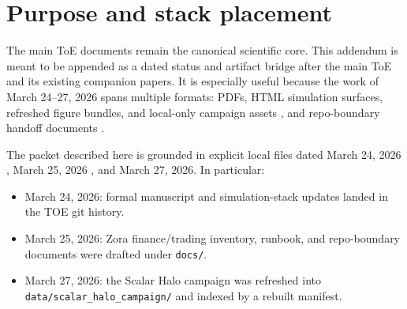 
\maketitle
\thispagestyle{empty}

\begin{abstract}
\ifIncludeRepoBoundary
This addendum records the publication-facing and repository-facing work completed between March 24, 2026 and March 27, 2026 so it can be appended cleanly to the existing Theory of Everything packet. The update covers four lanes: the MQGT--SCF Phase II and H1 supporting papers, the canonical ZoraASI top-10 simulation stack, the refreshed Scalar Halo / Cosmic Piano campaign package now housed under the TOE repository, and the March 25, 2026 cross-repository operating-boundary documents for the Zora finance and trading workstreams. The goal is not to restate the full ToE, but to provide a dated bridge from the main ToE volumes to the work actually shipped in this interval.
\else
This addendum records the publication-facing and campaign work completed between March 24, 2026 and March 27, 2026 for append to the Theory of Everything packet. It covers the MQGT--SCF Phase II and H1 supporting papers, the canonical ZoraASI top-10 simulation stack, and the refreshed Scalar Halo / Cosmic Piano campaign under the TOE repository. Cross-repository operating-boundary and finance/trading documentation (March 25, 2026) is omitted here; see  for the full operating record.
\fi
\end{abstract}

\section{Purpose and stack placement}
The main ToE documents remain the canonical scientific core. This addendum is meant to be appended as a dated status and artifact bridge after the main ToE and its existing companion papers. It is especially useful because the work of March 24--27, 2026 spans multiple formats: PDFs, HTML simulation surfaces, refreshed figure bundles, and local-only campaign assets%
\ifIncludeRepoBoundary
, and repo-boundary handoff documents%
\fi
.

The packet described here is grounded in explicit local files dated March 24, 2026%
\ifIncludeRepoBoundary
, March 25, 2026%
\fi
, and March 27, 2026. In particular:
\begin{itemize}
\item March 24, 2026: formal manuscript and simulation-stack updates landed in the TOE git history.
\ifIncludeRepoBoundary
\item March 25, 2026: Zora finance/trading inventory, runbook, and repo-boundary documents were drafted under \texttt{docs/}.
\fi
\item March 27, 2026: the Scalar Halo campaign was refreshed into \texttt{data/scalar\_halo\_campaign/} and indexed by a rebuilt manifest.
\end{itemize}

